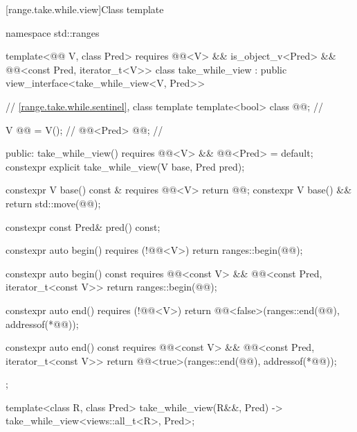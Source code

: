 [range.take.while.view]{Class template }

%
%
%
%
\begin{codeblock}
namespace std::ranges {
  template<@@ V, class Pred>
    requires @@<V> && is_object_v<Pred> &&
             @@<const Pred, iterator_t<V>>
  class take_while_view : public view_interface<take_while_view<V, Pred>> {
    // \ref{range.take.while.sentinel}, class template 
    template<bool> class @@;                      // \expos

    V @@ = V();                                      // \expos
    @@<Pred> @@;                            // \expos

  public:
    take_while_view() requires @@<V> && @@<Pred> = default;
    constexpr explicit take_while_view(V base, Pred pred);

    constexpr V base() const & requires @@<V> { return @@; }
    constexpr V base() && { return std::move(@@); }

    constexpr const Pred& pred() const;

    constexpr auto begin() requires (!@@<V>)
    { return ranges::begin(@@); }

    constexpr auto begin() const
      requires @@<const V> &&
               @@<const Pred, iterator_t<const V>>
    { return ranges::begin(@@); }

    constexpr auto end() requires (!@@<V>)
    { return @@<false>(ranges::end(@@), addressof(*@@)); }

    constexpr auto end() const
      requires @@<const V> &&
               @@<const Pred, iterator_t<const V>>
    { return @@<true>(ranges::end(@@), addressof(*@@)); }
  };

  template<class R, class Pred>
    take_while_view(R&&, Pred) -> take_while_view<views::all_t<R>, Pred>;
}
\end{codeblock}


